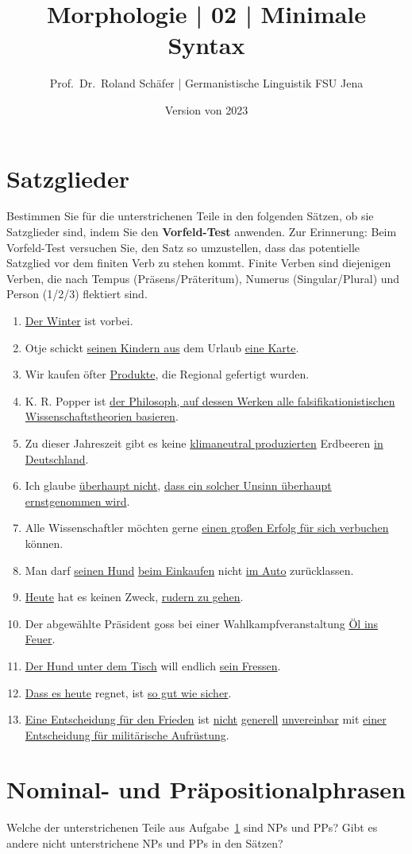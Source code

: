 \documentclass[12pt,a4paper,twoside]{article}
\author{Prof.\ Dr.\ Roland Schäfer | Germanistische Linguistik FSU Jena}
\title{Morphologie | 02 | Minimale Syntax}
\date{Version von 2023}
\begin{document}
\maketitle

\section{Satzglieder}\label{sec:satzglieder}

Bestimmen Sie für die unterstrichenen Teile in den folgenden Sätzen, ob sie Satzglieder sind, indem Sie den \textbf{Vorfeld-Test} anwenden.
Zur Erinnerung: Beim Vorfeld-Test versuchen Sie, den Satz so umzustellen, dass das potentielle Satzglied vor dem finiten Verb zu stehen kommt.
Finite Verben sind diejenigen Verben, die nach Tempus (Präsens\slash Präteritum), Numerus (Singular\slash Plural) und Person (1\slash 2\slash 3) flektiert sind.

\begin{enumerate}
  \item \ul{Der Winter} ist vorbei.
  \item Otje schickt \ul{seinen Kindern aus} dem Urlaub \ul{eine Karte}.
  \item Wir kaufen öfter \ul{Produkte}, die Regional gefertigt wurden.
  \item K. R. Popper ist \ul{der Philosoph, auf dessen Werken alle falsifikationistischen Wissenschaftstheorien basieren}.
  \item Zu dieser Jahreszeit gibt es keine \ul{klimaneutral produzierten} Erdbeeren \ul{in Deutschland}.
  \item Ich glaube \ul{überhaupt nicht}, \ul{dass ein solcher Unsinn überhaupt ernstgenommen wird}.
  \item Alle Wissenschaftler möchten gerne \ul{einen großen Erfolg für sich verbuchen} können.
  \item Man darf \ul{seinen Hund} \ul{beim Einkaufen} nicht \ul{im Auto} zurücklassen.
  \item \ul{Heute} hat es keinen Zweck, \ul{rudern zu gehen}.
  \item Der abgewählte Präsident goss bei einer Wahlkampfveranstaltung \ul{Öl ins Feuer}.
  \item \ul{Der Hund unter dem Tisch} will endlich \ul{sein Fressen}.
  \item \ul{Dass es heute} regnet, ist \ul{so gut wie sicher}.
  \item \ul{Eine Entscheidung für den Frieden} ist \ul{nicht} \ul{generell} \ul{unvereinbar} mit \ul{einer Entscheidung für militärische Aufrüstung}.
\end{enumerate}

\section{Nominal- und Präpositionalphrasen}

Welche der unterstrichenen Teile aus Aufgabe~\ref{sec:satzglieder} sind NPs und PPs?
Gibt es andere nicht unterstrichene NPs und PPs in den Sätzen?
\end{document}
